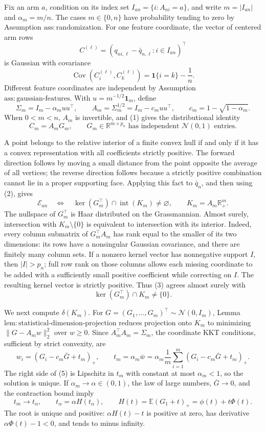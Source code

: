 Fix an arm \(a\), condition on its index set \(I_{an}=\{i:A_{ni}=a\}\), and write \(m=|I_{an}|\) and \(\alpha_m=m/n\).  The cases \(m\in\{0,n\}\) have probability tending to zero by Assumption \(\mathrm{ass{:}randomization}\).  For one feature coordinate, the vector of centered arm rows
\[
 C^{(\ell)}=(q_{ni,\ell}-\bar q_{n,\ell}:i\in I_{an})^\top
\]
is Gaussian with covariance
\[
 \operatorname{Cov}(C^{(\ell)}_i,C^{(\ell)}_k)
 =\mathbf1\{i=k\}-\frac1n.
 \tag{1}
\]
Different feature coordinates are independent by Assumption \(\mathrm{ass{:}gaussian\mbox{-}features}\).  With \(u=m^{-1/2}\mathbf1_m\), define
\[
 \Sigma_m=I_m-\alpha_muu^\top,
 \qquad
 A_m=\Sigma_m^{1/2}=I_m-c_muu^\top,
 \qquad
 c_m=1-\sqrt{1-\alpha_m}.
\]
When \(0<m<n\), \(A_m\) is invertible, and (1) gives the distributional identity
\[
 C_m=A_mG_m,
 \qquad G_m\in\mathbb R^{m\times p_n}
 \text{ has independent }\mathcal N(0,1)\text{ entries}.
 \tag{2}
\]

A point belongs to the relative interior of a finite convex hull if and only if it has a convex representation with all coefficients strictly positive.  The forward direction follows by moving a small distance from the point opposite the average of all vertices; the reverse direction follows because a strictly positive combination cannot lie in a proper supporting face.  Applying this fact to \(\bar q_n\), and then using (2), gives
\[
 \mathcal E_{an}
 \quad\Longleftrightarrow\quad
 \ker(G_m^\top)\cap\operatorname{int}(K_m)\ne\varnothing,
 \qquad K_m=A_m\mathbb R_+^m.
 \tag{3}
\]
The nullspace of \(G_m^\top\) is Haar distributed on the Grassmannian.  Almost surely, intersection with \(K_m\setminus\{0\}\) is equivalent to intersection with its interior.  Indeed, every column submatrix of \(G_m^\top A_m\) has rank equal to the smaller of its two dimensions: its rows have a nonsingular Gaussian covariance, and there are finitely many column sets.  If a nonzero kernel vector has nonnegative support \(I\), then \(|I|>p_n\); full row rank on those columns allows each missing coordinate to be added with a sufficiently small positive coefficient while correcting on \(I\).  The resulting kernel vector is strictly positive.  Thus (3) agrees almost surely with
\[
 \ker(G_m^\top)\cap K_m\ne\{0\}.
 \tag{4}
\]

We next compute \(\delta(K_m)\).  For \(G=(G_1,\ldots,G_m)^\top\sim\mathcal N(0,I_m)\), Lemma \(\mathrm{lem{:}statistical\mbox{-}dimension\mbox{-}projection}\) reduces projection onto \(K_m\) to minimizing \(\|G-A_mw\|_2^2\) over \(w\ge0\).  Since \(A_m^\top A_m=\Sigma_m\), the coordinate KKT conditions, sufficient by strict convexity, are
\[
 w_i=(G_i-c_m\bar G+t_m)_+,
 \qquad
 t_m=\alpha_m\bar w
 =\alpha_m\frac1m\sum_{i=1}^m(G_i-c_m\bar G+t_m)_+.
 \tag{5}
\]
The right side of (5) is Lipschitz in \(t_m\) with constant at most \(\alpha_m<1\), so the solution is unique.  If \(\alpha_m\to\alpha\in(0,1)\), the law of large numbers, \(\bar G\to0\), and the contraction bound imply
\[
 t_m\longrightarrow t_\alpha,
 \qquad
 t_\alpha=\alpha H(t_\alpha),
 \qquad H(t)=\mathbb E(G_1+t)_+=\phi(t)+t\Phi(t).
 \tag{6}
\]
The root is unique and positive: \(\alpha H(t)-t\) is positive at zero, has derivative \(\alpha\Phi(t)-1<0\), and tends to minus infinity.

